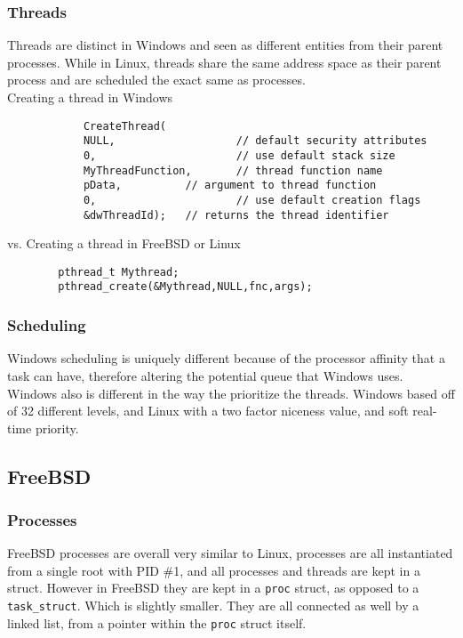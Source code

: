 \documentclass[10pt,conference,draftclsnofoot,onecolumn]{IEEEtran}
\begin{document}
        \subsubsection{Threads}
            Threads are distinct in Windows and seen as different entities from their parent processes. While in Linux, threads share the same address space as their parent process and are scheduled the exact same as processes.\\
            
                \center Creating a thread in Windows 
    \begin{lstlisting}
            CreateThread( 
            NULL,                   // default security attributes
            0,                      // use default stack size  
            MyThreadFunction,       // thread function name
            pData,          // argument to thread function 
            0,                      // use default creation flags 
            &dwThreadId);   // returns the thread identifier  
    \end{lstlisting} 
    
    \center vs. Creating a thread in FreeBSD or Linux
    
    \begin{lstlisting}
    	pthread_t Mythread;
        pthread_create(&Mythread,NULL,fnc,args); 
    \end{lstlisting}
        \subsubsection{Scheduling}
            Windows scheduling is uniquely different because of the processor affinity that a task can have, therefore altering the potential queue that Windows uses. Windows also is different in the way the prioritize the threads. Windows based off of 32 different levels, and Linux with a two factor niceness value, and soft real-time priority.\cite{1}\cite{4}\newline \newline
    \subsection{FreeBSD}
        \subsubsection{Processes}
                FreeBSD processes are overall very similar to Linux, processes are all instantiated from a single root with PID \#1, and all processes and threads are kept in a struct. However in FreeBSD they are kept in a \texttt{proc} struct, as opposed to a \texttt{task\_struct}. Which is slightly smaller. They are all connected as well by a linked list, from a pointer within the \texttt{proc} struct itself.\\
\end{document}
